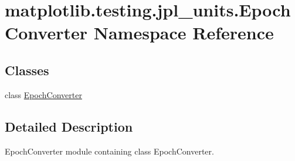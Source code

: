 \hypertarget{namespacematplotlib_1_1testing_1_1jpl__units_1_1EpochConverter}{}\section{matplotlib.\+testing.\+jpl\+\_\+units.\+Epoch\+Converter Namespace Reference}
\label{namespacematplotlib_1_1testing_1_1jpl__units_1_1EpochConverter}
\subsection*{Classes}
\begin{DoxyCompactItemize}
\item 
class \hyperlink{classmatplotlib_1_1testing_1_1jpl__units_1_1EpochConverter_1_1EpochConverter}{Epoch\+Converter}
\end{DoxyCompactItemize}


\subsection{Detailed Description}
\begin{DoxyVerb}EpochConverter module containing class EpochConverter.\end{DoxyVerb}
 